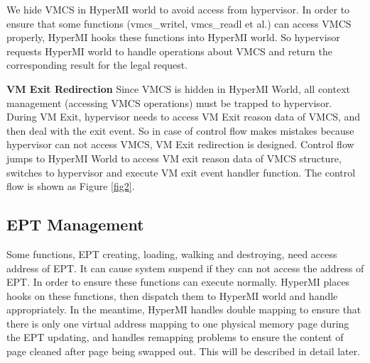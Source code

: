 \documentclass[conference]{IEEEtran}
\begin{document}
We hide VMCS in HyperMI world to avoid access from hypervisor. 
In order to ensure that some functions (vmcs\_writel, vmcs\_readl et al.) can access VMCS properly, HyperMI hooks these functions into HyperMI world. So hypervisor requests HyperMI world to handle operations about VMCS and return the corresponding result for the legal request. 

\textbf{VM Exit Redirection}
Since VMCS is hidden in HyperMI World, all context management (accessing VMCS operations)  must be trapped to hypervisor. During VM Exit, hypervisor needs to access  VM Exit reason data of VMCS, and then deal with the exit event. So in case of control flow makes mistakes because hypervisor can not access VMCS, VM Exit redirection is designed. Control flow jumps to HyperMI World to access VM exit reason data of VMCS structure, switches to hypervisor and execute VM exit event handler function. The control flow is shown as Figure \ref{fig2}.

\subsection{EPT Management}
Some functions, EPT creating, loading, walking and destroying, need access address of EPT. It can cause system suspend if they can not access the address of EPT. In order to ensure these functions can execute normally. HyperMI places hooks on these functions, then dispatch them to HyperMI world and handle appropriately. In the meantime, HyperMI handles double mapping to ensure that there is only one virtual address mapping to one physical memory page during the EPT updating, and handles remapping problems to ensure the content of page cleaned after page being swapped out. This will be described in detail later.
\end{document}
